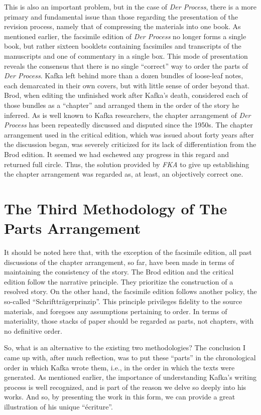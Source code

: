 \documentclass{article}
\begin{document}
This is also an important problem, but in the case of \emph{Der
Process}, there is a more primary and fundamental issue than those
regarding the presentation of the revision process, namely that of
compressing the materials into one book. As mentioned earlier, the
facsimile edition of \emph{Der Process} no longer forms a single book,
but rather sixteen booklets containing facsimiles and transcripts of the
manuscripts and one of commentary in a single box. This mode of
presentation reveals the consensus that there is no single ``correct'' way
to order the parts of \emph{Der Process}. Kafka left behind more than a
dozen bundles of loose-leaf notes, each demarcated in their own covers,
but with little sense of order beyond that. Brod, when editing the
unfinished work after Kafka's death, considered each of those bundles as
a ``chapter'' and arranged them in the order of the story he inferred.
As is well known to Kafka researchers, the chapter arrangement of
\emph{Der Process} has been repeatedly discussed and disputed since the
1950s. The chapter arrangement used in the critical edition, which was
issued about forty years after the discussion began, was severely
criticized for its lack of differentiation from the Brod edition. It
seemed we had eschewed any progress in this regard and returned full
circle. Thus, the solution provided by \emph{FKA} to give up
establishing the chapter arrangement was regarded as, at least, an
objectively correct one.

\section{The Third Methodology of The Parts
Arrangement}\label{the-third-methodology-of-the-parts-arrangement}

It should be noted here that, with the exception of the facsimile
edition, all past discussions of the chapter arrangement, so far, have
been made in terms of maintaining the consistency of the story. The Brod
edition and the critical edition follow the narrative principle. They
prioritize the construction of a resolved story. On the other hand, the
facsimile edition follows another policy, the so-called
``Schriftträgerprinzip''. This principle privileges fidelity to the
source materials, and foregoes any assumptions pertaining to order. In
terms of materiality, those stacks of paper should be regarded as parts,
not chapters, with no definitive order.

So, what is an alternative to the existing two methodologies? The
conclusion I came up with, after much reflection, was to put these
``parts'' in the chronological order in which Kafka wrote them, i.e., in
the order in which the texts were generated. As mentioned earlier, the
importance of understanding Kafka's writing process is well recognized,
and is part of the reason we delve so deeply into his works. And so, by
presenting the work in this form, we can provide a great illustration
of his unique ``écriture''.
\end{document}

